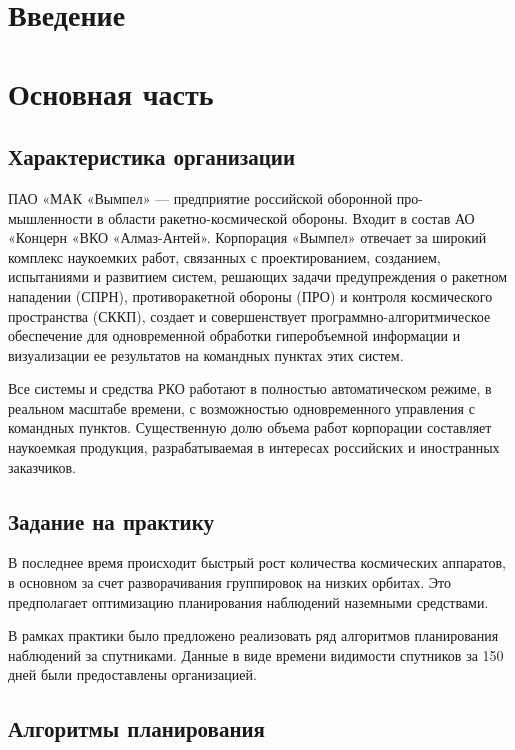 \chapter*{Введение}



\chapter{Основная часть}

\section{Характеристика организации}

ПАО «МАК «Вымпел» — предприятие российской оборонной про-
мышленности в области ракетно-космической обороны. Входит в состав АО «Концерн «ВКО «Алмаз-Антей». Корпорация «Вымпел» отвечает за широкий комплекс наукоемких работ, связанных с проектированием, созданием, испытаниями и развитием систем, решающих задачи предупреждения о ракетном нападении (СПРН), противоракетной обороны (ПРО) и контроля космического пространства (СККП), создает и совершенствует программно-алгоритмическое обеспечение для одновременной обработки гиперобъемной информации и визуализации ее результатов на командных пунктах этих систем. 

Все системы и средства РКО работают в полностью автоматическом режиме, в реальном масштабе времени, с возможностью одновременного управления с командных пунктов. Существенную долю объема работ корпорации составляет наукоемкая продукция, разрабатываемая в интересах российских и иностранных заказчиков.\cite{about}

\section{Задание на практику}

В последнее время происходит быстрый рост количества космических аппаратов, в основном за счет разворачивания группировок на низких орбитах.\cite{Фатеев2014} Это предполагает оптимизацию планирования наблюдений наземными средствами.

В рамках практики было предложено реализовать ряд алгоритмов планирования наблюдений за спутниками. Данные в виде времени видимости спутников за 150 дней были предоставлены организацией.

\section{Алгоритмы планирования}

